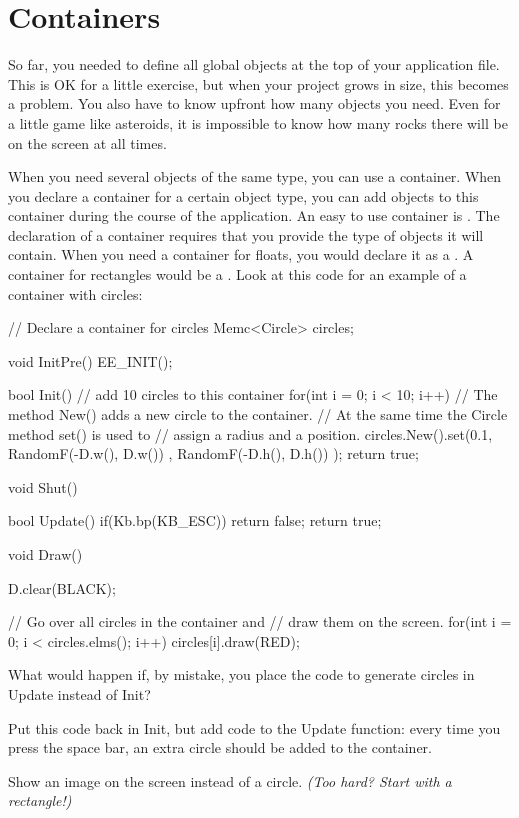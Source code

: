 \chapter{Containers}

So far, you needed to define all global objects at the top of your application file. This is OK for a little exercise, but when your project grows in size, this becomes a problem. You also have to know upfront how many objects you need. Even for a little game like asteroids, it is impossible to know how many rocks there will be on the screen at all times.

When you need several objects of the same type, you can use a container. When you declare a container for a certain object type, you can add objects to this container during the course of the application. An easy to use container is . The declaration of a container requires that you provide the type of objects it will contain. When you need a container for floats, you would declare it as a . A container for rectangles would be a . Look at this code for an example of a container with circles:

\begin{code}
// Declare a container for circles
Memc<Circle> circles;

void InitPre()
{
   EE_INIT();
}

bool Init()
{
    // add 10 circles to this container  
	for(int i = 0; i < 10; i++)
    {
	    // The method New() adds a new circle to the container. 
	    // At the same time the Circle method set() is used to 
	    // assign a radius and a position.
        circles.New().set(0.1, RandomF(-D.w(), D.w())
				                     , RandomF(-D.h(), D.h())
				);
   }
   return true;
}

void Shut() {}

bool Update()
{
   if(Kb.bp(KB_ESC)) return false;  
   return true;
}

void Draw()
{
   D.clear(BLACK);
   
   // Go over all circles in the container and
   // draw them on the screen.
   for(int i = 0; i < circles.elms(); i++)
   {
      circles[i].draw(RED);
   }
}
\end{code}

\begin{exercise}
What would happen if, by mistake, you place the code to generate circles in Update instead of Init?
\end{exercise}
\begin{exercise}
Put this code back in Init, but add code to the Update function: every time you press the space bar, an extra circle should be added to the container.
\end{exercise}
\begin{exercise}
Show an image on the screen instead of a circle. \textit{(Too hard? Start with a rectangle!)}
\end{exercise}


